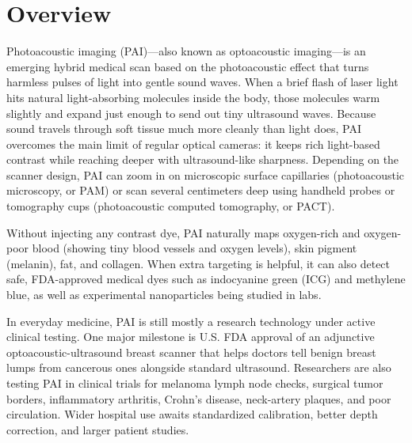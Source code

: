 \label{ch:infographic-pai}

\section{Overview}

Photoacoustic imaging (PAI)---also known as optoacoustic imaging---is an emerging hybrid medical scan based on the photoacoustic effect that turns harmless pulses of light into gentle sound waves. When a brief flash of laser light hits natural light-absorbing molecules inside the body, those molecules warm slightly and expand just enough to send out tiny ultrasound waves. Because sound travels through soft tissue much more cleanly than light does, PAI overcomes the main limit of regular optical cameras: it keeps rich light-based contrast while reaching deeper with ultrasound-like sharpness. Depending on the scanner design, PAI can zoom in on microscopic surface capillaries (photoacoustic microscopy, or PAM) or scan several centimeters deep using handheld probes or tomography cups (photoacoustic computed tomography, or PACT).

Without injecting any contrast dye, PAI naturally maps oxygen-rich and oxygen-poor blood (showing tiny blood vessels and oxygen levels), skin pigment (melanin), fat, and collagen. When extra targeting is helpful, it can also detect safe, FDA-approved medical dyes such as indocyanine green (ICG) and methylene blue, as well as experimental nanoparticles being studied in labs.

In everyday medicine, PAI is still mostly a research technology under active clinical testing. One major milestone is U.S. FDA approval of an adjunctive optoacoustic-ultrasound breast scanner that helps doctors tell benign breast lumps from cancerous ones alongside standard ultrasound. Researchers are also testing PAI in clinical trials for melanoma lymph node checks, surgical tumor borders, inflammatory arthritis, Crohn's disease, neck-artery plaques, and poor circulation. Wider hospital use awaits standardized calibration, better depth correction, and larger patient studies.

